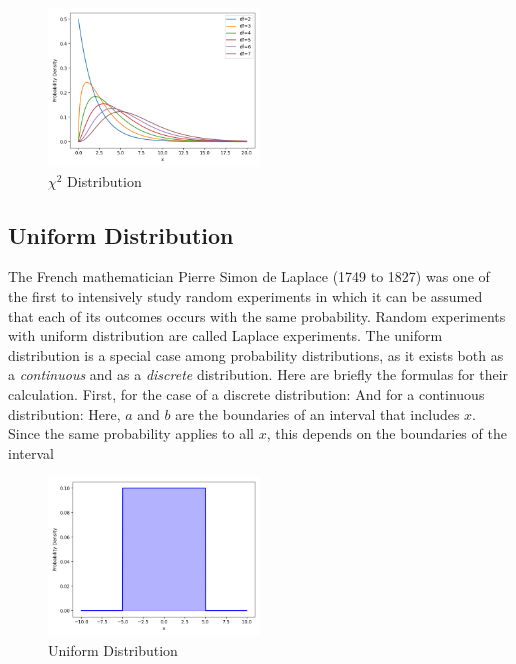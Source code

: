 \begin{figure}[h]
    \centering
    \includegraphics[width=0.5\textwidth]{../images/plot_chi_squared_overlayed.png}
    \caption{$\chi^2$ Distribution}
    \label{fig:chi_square_distribution}
\end{figure}

\subsection{Uniform Distribution}\label{Uniform Distribution}
The French mathematician Pierre Simon de Laplace (1749 to 1827) was one of the first to intensively study random experiments in which it can be assumed that each of its outcomes occurs with the same probability. Random experiments with uniform distribution are called Laplace experiments. The uniform distribution is a special case among probability distributions, as it exists both as a \textit{continuous} and as a \textit{discrete} distribution. Here are briefly the formulas for their calculation. First, for the case of a discrete distribution:
And for a continuous distribution:
Here, $a$ and $b$ are the boundaries of an interval that includes $x$. Since the same probability applies to all $x$, this depends on the boundaries of the interval

\begin{figure}[h]
    \centering
    \includegraphics[width=0.5\textwidth]{../images/plot_uniform_distribution.png}
    \caption{Uniform Distribution}
    \label{fig:uniform_distribution}
\end{figure}

